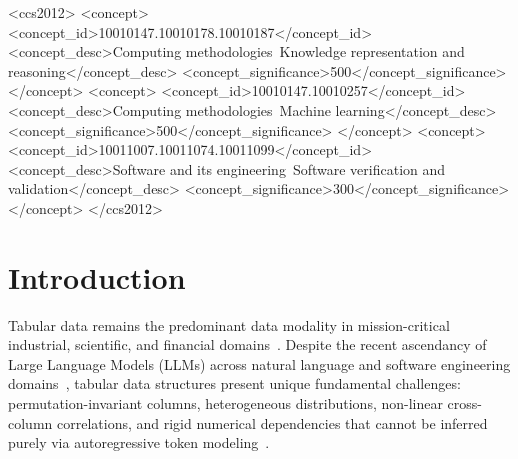 \documentclass[sigconf]{acmart}
\begin{document}
\begin{CCSXML}
<ccs2012>
   <concept>
       <concept_id>10010147.10010178.10010187</concept_id>
       <concept_desc>Computing methodologies~Knowledge representation and reasoning</concept_desc>
       <concept_significance>500</concept_significance>
   </concept>
   <concept>
       <concept_id>10010147.10010257</concept_id>
       <concept_desc>Computing methodologies~Machine learning</concept_desc>
       <concept_significance>500</concept_significance>
   </concept>
   <concept>
       <concept_id>10011007.10011074.10011099</concept_id>
       <concept_desc>Software and its engineering~Software verification and validation</concept_desc>
       <concept_significance>300</concept_significance>
   </concept>
</ccs2012>
\end{CCSXML}



\maketitle

\section{Introduction}

Tabular data remains the predominant data modality in mission-critical industrial, scientific, and financial domains~\cite{borisov2022deep,grinsztajn2022tree}. Despite the recent ascendancy of Large Language Models (LLMs) across natural language and software engineering domains~\cite{achiam2023gpt4,anthropic2024claude35,geminiteam2024gemini,jimenez2024swebench}, tabular data structures present unique fundamental challenges: permutation-invariant columns, heterogeneous distributions, non-linear cross-column correlations, and rigid numerical dependencies that cannot be inferred purely via autoregressive token modeling~\cite{xu2019synthesizing,kotelnikov2023tabddpm,sui2024table}.
\end{document}
